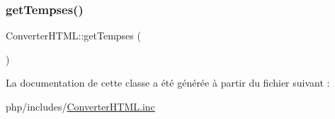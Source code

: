 \subsubsection{\texorpdfstring{get\+Tempses()}{getTempses()}}
{\footnotesize\ttfamily Converter\+H\+T\+M\+L\+::get\+Tempses (\begin{DoxyParamCaption}{ }\end{DoxyParamCaption})\hspace{0.3cm}{\ttfamily [protected]}}



La documentation de cette classe a été générée à partir du fichier suivant \+:\begin{DoxyCompactItemize}
\item 
php/includes/\hyperlink{_converter_h_t_m_l_8inc}{Converter\+H\+T\+M\+L.\+inc}\end{DoxyCompactItemize}
